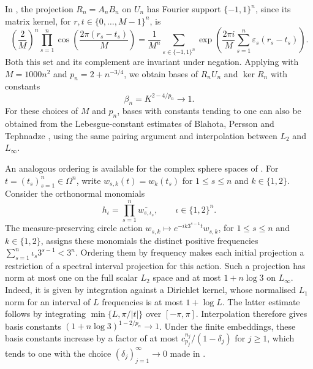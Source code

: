 \documentclass[11pt,a4paper,reqno]{amsart}
\theoremstyle{definition}
\numberwithin{equation}{section}
\begin{document}
In , the projection $R_n=A_nB_n$ on $U_n$ has Fourier support $\{-1,1\}^n$, since its matrix kernel, for $r,t\in\{0,\ldots,M-1\}^n$, is
\begin{equation*}
 \left(\frac2M\right)^n
       \prod_{s=1}^n\cos\left(\frac{2\pi(r_s-t_s)}M\right)
 =\frac1{M^n}\sum_{\varepsilon\in\{-1,1\}^n}
       \exp\left(\frac{2\pi i}{M}
                    \sum_{s=1}^n\varepsilon_s(r_s-t_s)\right).
\end{equation*}
Both this set and its complement are invariant under negation. Applying  with $M=1000n^2$ and $p_n=2+n^{-3/4}$, we obtain bases of $R_nU_n$ and $\ker R_n$ with constants
\begin{equation}\label{eq:sampled-basis-constants}
 \beta_n=K^{2-4/p_n}\longrightarrow1.
\end{equation}
For these choices of $M$ and $p_n$, bases with constants tending to one can also be obtained from the Lebesgue-constant estimates of Blahota, Persson and Tephnadze \cite[Theorem~1]{BlahotaPerssonTephnadze2018}, using the same pairing argument and interpolation between $L_2$ and $L_\infty$.

An analogous ordering is available for the complex sphere spaces of . For $t=(t_s)_{s=1}^n\in\Omega^n$, write $w_{s,k}(t)=w_k(t_s)$ for $1\leq s\leq n$ and $k\in\{1,2\}$. Consider the orthonormal monomials
\begin{equation*}
 h_\iota=\prod_{s=1}^n\overline{w_{s,\iota_s}},
 \qquad \iota\in\{1,2\}^n.
\end{equation*}
The measure-preserving circle action $w_{s,k}\mapsto e^{-ik3^{s-1}t}w_{s,k}$, for $1\leq s\leq n$ and $k\in\{1,2\}$, assigns these monomials the distinct positive frequencies $\sum_{s=1}^n\iota_s3^{s-1}<3^n$. Ordering them by frequency makes each initial projection a restriction of a spectral interval projection for this action. Such a projection has norm at most one on the full scalar $L_2$ space and at most $1+n\log3$ on $L_\infty$. Indeed, it is given by integration against a Dirichlet kernel, whose normalised $L_1$ norm for an interval of $L$ frequencies is at most $1+\log L$. The latter estimate follows by integrating $\min\{L,\pi/|t|\}$ over $[-\pi,\pi]$. Interpolation therefore gives basis constants $(1+n\log3)^{1-2/p_n}\to1$. Under the finite embeddings, these basis constants increase by a factor of at most $c_{p_j}^{n_j}/(1-\delta_j)$ for $j\geq1$, which tends to one with the choice $(\delta_j)_{j=1}^{\infty}\to0$ made in .
\end{document}
